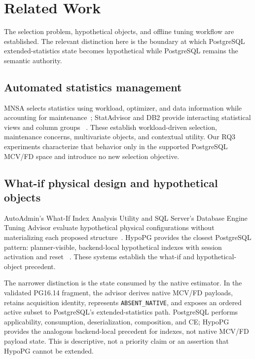 \section{Related Work}

The selection problem, hypothetical objects, and offline tuning workflow are
established.  The relevant distinction here is the boundary at which
PostgreSQL extended-statistics state becomes hypothetical while PostgreSQL
remains the semantic authority.

\subsection{Automated statistics management}

MNSA selects statistics using workload, optimizer, and data information while
accounting for maintenance~\cite{chaudhuri2001statistics}; StatAdvisor and
DB2 provide interacting statistical views and column groups
~\cite{elhelw2009statadvisor,db2statviews}.  These establish workload-driven
selection, maintenance concerns, multivariate objects, and contextual utility.
Our RQ3 experiments characterize that behavior only in the supported
PostgreSQL MCV/FD space and introduce no new selection objective.

\subsection{What-if physical design and hypothetical objects}

AutoAdmin's What-If Index Analysis Utility and SQL Server's Database Engine
Tuning Advisor evaluate hypothetical physical configurations without
materializing each proposed structure~\cite{chaudhuri1998whatif,microsoftdta}.
HypoPG provides the closest PostgreSQL pattern: planner-visible,
backend-local hypothetical indexes with session activation and reset
~\cite{hypopg}.  These systems establish the what-if and hypothetical-object
precedent.

The narrower distinction is the state consumed by the native estimator.  In
the validated PG16.14 fragment, the advisor derives native MCV/FD payloads,
retains acquisition identity, represents \texttt{ABSENT\_NATIVE}, and exposes
an ordered active subset to PostgreSQL's extended-statistics path.  PostgreSQL
performs applicability, consumption, deserialization, composition, and CE;
HypoPG provides the analogous backend-local precedent for indexes, not native
MCV/FD payload state.  This is descriptive, not a priority claim or an
assertion that HypoPG cannot be extended.

